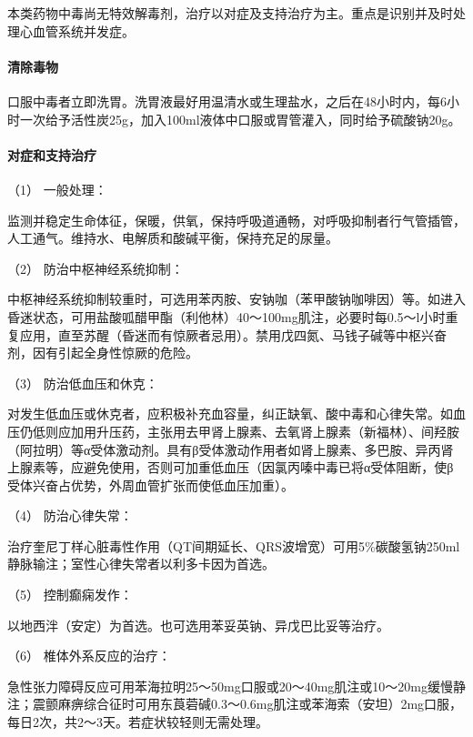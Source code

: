 本类药物中毒尚无特效解毒剂，治疗以对症及支持治疗为主。重点是识别并及时处理心血管系统并发症。

\paragraph{清除毒物}

口服中毒者立即洗胃。洗胃液最好用温清水或生理盐水，之后在48小时内，每6小时一次给予活性炭25g，加入100ml液体中口服或胃管灌入，同时给予硫酸钠20g。

\paragraph{对症和支持治疗}

\hypertarget{text00133.htmlux5cux23CHP5-2-3-7-2-1}{}
（1） 一般处理：

监测并稳定生命体征，保暖，供氧，保持呼吸道通畅，对呼吸抑制者行气管插管，人工通气。维持水、电解质和酸碱平衡，保持充足的尿量。

\hypertarget{text00133.htmlux5cux23CHP5-2-3-7-2-2}{}
（2） 防治中枢神经系统抑制：

中枢神经系统抑制较重时，可选用苯丙胺、安钠咖（苯甲酸钠咖啡因）等。如进入昏迷状态，可用盐酸呱醋甲酯（利他林）40～100mg肌注，必要时每0.5～l小时重复应用，直至苏醒（昏迷而有惊厥者忌用）。禁用戊四氮、马钱子碱等中枢兴奋剂，因有引起全身性惊厥的危险。

\hypertarget{text00133.htmlux5cux23CHP5-2-3-7-2-3}{}
（3） 防治低血压和休克：

对发生低血压或休克者，应积极补充血容量，纠正缺氧、酸中毒和心律失常。如血压仍低则应加用升压药，主张用去甲肾上腺素、去氧肾上腺素（新福林）、间羟胺（阿拉明）等α受体激动剂。具有β受体激动作用者如肾上腺素、多巴胺、异丙肾上腺素等，应避免使用，否则可加重低血压（因氯丙嗪中毒已将α受体阻断，使β受体兴奋占优势，外周血管扩张而使低血压加重）。

\hypertarget{text00133.htmlux5cux23CHP5-2-3-7-2-4}{}
（4） 防治心律失常：

治疗奎尼丁样心脏毒性作用（QT间期延长、QRS波增宽）可用5\%碳酸氢钠250ml静脉输注；室性心律失常者以利多卡因为首选。

\hypertarget{text00133.htmlux5cux23CHP5-2-3-7-2-5}{}
（5） 控制癫痫发作：

以地西泮（安定）为首选。也可选用苯妥英钠、异戊巴比妥等治疗。

\hypertarget{text00133.htmlux5cux23CHP5-2-3-7-2-6}{}
（6） 椎体外系反应的治疗：

急性张力障碍反应可用苯海拉明25～50mg口服或20～40mg肌注或10～20mg缓慢静注；震颤麻痹综合征时可用东莨菪碱0.3～0.6mg肌注或苯海索（安坦）2mg口服，每日2次，共2～3天。若症状较轻则无需处理。

